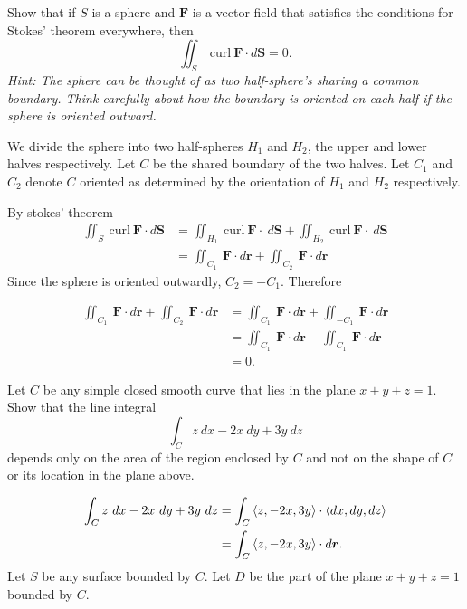 \documentclass[12pt]{exam}
\newcommand{\mbf}{\mathbf{F}}
\begin{document}
\begin{questions}
\newpage

\question Show that if \(S\) is a sphere and \(\mbf\) is a vector field that satisfies the conditions for Stokes' theorem everywhere, then 
\[
    \iint_S~\mathrm{curl}~\mbf\cdot d\mathbf{S} = 0.
\]
\emph{Hint: The sphere can be thought of as two half-sphere's sharing a common boundary. Think carefully about how the boundary is oriented on each half if the sphere is oriented outward.}
    \ifprintanswers
        \begin{solution}
            We divide the sphere into two half-spheres \(H_1\) and \(H_2\), the upper and lower halves respectively. 
            Let \(C\) be the shared boundary of the two halves. Let \(C_1\) and \(C_2\) denote \(C\) oriented as determined by the orientation of \(H_1\) and \(H_2\) respectively.

            By stokes' theorem 
            \begin{align*}
                \iint_S~\mathrm{curl}~\mbf\cdot d\mathbf{S} 
                    & =  \iint_{H_1}~\mathrm{curl}~\mbf\cdot~d\mathbf{S}+\iint_{H_2}~\mathrm{curl}~\mbf\cdot~d\mathbf{S}\\
                    & = \iint_{C_1}~\mbf\cdot d\bm{r}+\iint_{C_2}~\mbf\cdot d\bm{r}
            \end{align*}
        Since the sphere is oriented outwardly, \(C_2=-C_1\). Therefore
        
        \begin{align*}
            \iint_{C_1}~\mbf\cdot d\bm{r}+\iint_{C_2}~\mbf\cdot d\bm{r} 
                & = \iint_{C_1}~\mbf\cdot d\bm{r}+\iint_{-C_1}~\mbf\cdot d\bm{r}\\
                & = \iint_{C_1}~\mbf\cdot d\bm{r}-\iint_{C_1}~\mbf\cdot d\bm{r}\\
                & = 0.
        \end{align*}
        \end{solution}
    \else
        \vfill
    \fi

\newpage 

\question Let \(C\) be any simple closed smooth curve that lies in the plane \(x+y+z=1\). 
Show that the line integral 
\[
        \int_C z~dx-2x~dy+3y~dz
\]
depends only on the area of the region enclosed by \(C\) and not on the shape of \(C\) or its location in the plane above.
    \ifprintanswers
        \begin{solution}
        \begin{align*}
            \int_C z~dx-2x~dy+3y~dz & = \int_C \left\langle z,-2x,3y \right\rangle\cdot\left\langle dx,dy,dz \right\rangle\\
                & = \int_C \left\langle z,-2x,3y \right\rangle\cdot d\bm{r}.
        \end{align*}
        Let \(S\) be any surface bounded by \(C\). 
        Let \(D\) be the part of the plane \(x+y+z=1\) bounded by \(C\). 


\end{solution}
\end{questions}
\end{document}
